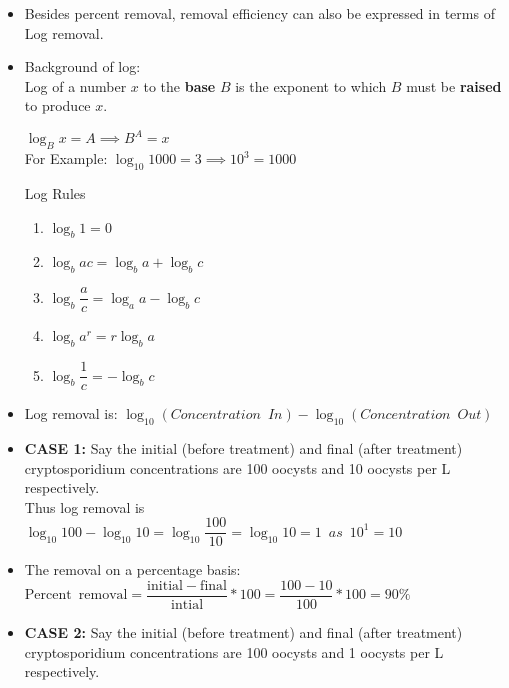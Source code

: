 \begin{itemize}
\item Besides percent removal, removal efficiency can also be expressed in terms of Log removal.
\item Background of log:\\ 
Log of a number $x$ to the \textbf{base} $B$ is the exponent to which $B$ must be \textbf{raised} to produce $x$.\\
\vspace{0.3cm}
\begin{center}
$\log_B x=A \implies B^A=x$\\
For Example: $\log_{10} 1000=3 \implies 10^3=1000$ \\
\end{center}
\vspace{0.3cm}
Log Rules\\
\begin{enumerate}
\item $\log_{b} 1=0$
\item $\log_{b} ac=\log_{b} a + \log_{b} c$
\item $\log_{b} \dfrac{a}{c}=\log_{a} a - \log_{b} c$
\item $\log_{b} a^r=r\log_{b} a$
\item $\log_{b} \dfrac{1}{c}=-\log_{b} c$
\end{enumerate}
\vspace{0.3cm}
\item Log removal is:  $\log_{10} {(Concentration \enspace In)} - \log_{10} {(Concentration \enspace Out)}$
\item \textbf{CASE 1: } Say the initial (before treatment) and final (after treatment) cryptosporidium concentrations are 100 oocysts and 10 oocysts per L respectively. \\
\vspace{0.3cm}
Thus log removal is $\log_{10} 100 - \log_{10} 10 = \log_{10}\dfrac{100}{10}=\log_{10} 10 = \boxed{1} \enspace as \enspace 10^1=10 $\\
\vspace{0.3cm}
\item The removal on a percentage basis: $\mathrm{Percent \enspace removal} = \dfrac{\mathrm{initial}-\mathrm{final}}{\mathrm{intial}}*100=\dfrac{100-10}{100}*100=90\%$\\
\item \textbf{CASE 2: } Say the initial (before treatment) and final (after treatment) cryptosporidium concentrations are 100 oocysts and 1 oocysts per L respectively. \\
\vspace{0.3cm}

\end{itemize}
